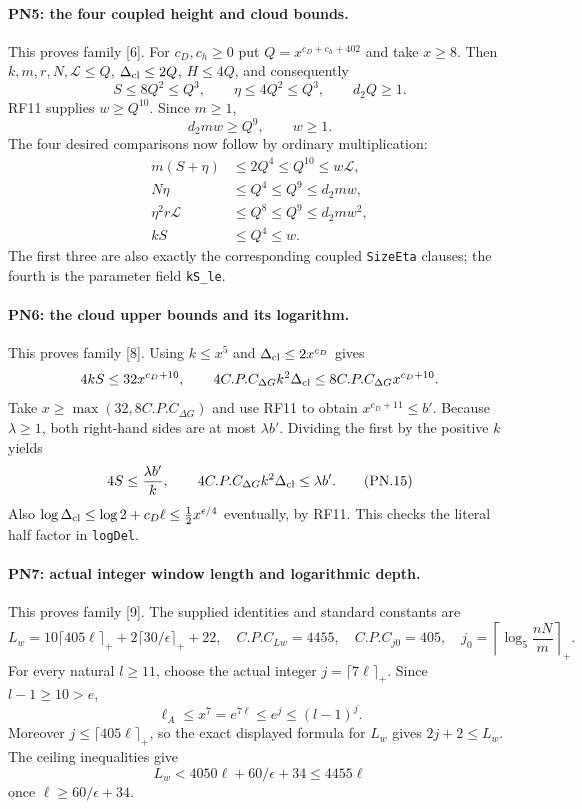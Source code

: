 \documentclass[11pt,a4paper]{article}
\numberwithin{equation}{section}
\theoremstyle{remark}\newtheorem{remark}[theorem]{Remark}
\begin{document}
\paragraph{PN5: the four coupled height and cloud bounds.}
This proves family [6]. For $c_D,c_h\geq0$ put
$Q=x^{c_D+c_h+402}$ and take $x\geq8$.
Then $k,m,r,N,\mathcal L\leq Q$, $\Delta_{\rm cl}\leq2Q$,
$H\leq4Q$, and consequently
\[
 S\leq8Q^2\leq Q^3,\qquad
 \eta\leq4Q^2\leq Q^3,\qquad d_2Q\geq1.
\]
RF11 supplies $w\geq Q^{10}$. Since $m\geq1$,
\[
 d_2mw\geq Q^9,\qquad w\geq1.
\]
The four desired comparisons now follow by ordinary multiplication:
\begin{align*}
 m(S+\eta)&\leq2Q^4\leq Q^{10}\leq w\mathcal L,\\
 N\eta&\leq Q^4\leq Q^9\leq d_2mw,\\
 \eta^2r\mathcal L&\leq Q^8\leq Q^9\leq d_2mw^2,\\
 kS&\leq Q^4\leq w.
                                                               \tag{PN.14}
\end{align*}
The first three are also exactly the corresponding coupled
\texttt{SizeEta} clauses; the fourth is the parameter field
\texttt{kS\_\allowbreak le}.

\paragraph{PN6: the cloud upper bounds and its logarithm.}
This proves family [8]. Using $k\leq x^5$ and
$\Delta_{\rm cl}\leq2x^{c_D}$ gives
\[
 4kS\leq32x^{c_D+10},\qquad
 4C.P.C_{\Delta G}k^2\Delta_{\rm cl}
                       \leq8C.P.C_{\Delta G}x^{c_D+10}.
\]
Take $x\geq\max(32,8C.P.C_{\Delta G})$ and use RF11 to obtain
$x^{c_D+11}\leq b'$. Because $\lambda\geq1$, both right-hand
sides are at most $\lambda b'$. Dividing the first by the positive
$k$ yields
\[
 4S\leq\frac{\lambda b'}k,\qquad
 4C.P.C_{\Delta G}k^2\Delta_{\rm cl}\leq\lambda b'.       \tag{PN.15}
\]
Also
$\log\Delta_{\rm cl}\leq\log2+c_D\ell
\leq\tfrac12x^{\epsilon/4}$ eventually, by RF11.
This checks the literal half factor in \texttt{logDel}.

\paragraph{PN7: actual integer window length and logarithmic depth.}
This proves family [9]. The supplied identities and standard constants
are
\[
 L_w=10\lceil405\ell\rceil_++2\lceil30/\epsilon\rceil_++22,
 \quad C.P.C_{Lw}=4455,\quad C.P.C_{j0}=405,
 \quad j_0=\left\lceil\log_5\frac{nN}{m}\right\rceil_+.
                                                               \tag{PN.16}
\]
For every natural $l\geq11$, choose the actual integer
$j=\lceil7\ell\rceil_+$. Since $l-1\geq10>e$,
\[
 \ell_A\leq x^7=e^{7\ell}\leq e^j\leq(l-1)^j.
\]
Moreover $j\leq\lceil405\ell\rceil_+$, so the exact displayed
formula for $L_w$ gives $2j+2\leq L_w$. The ceiling inequalities give
\[
 L_w<4050\ell+60/\epsilon+34\leq4455\ell
\]
once $\ell\geq60/\epsilon+34$.
\end{document}
